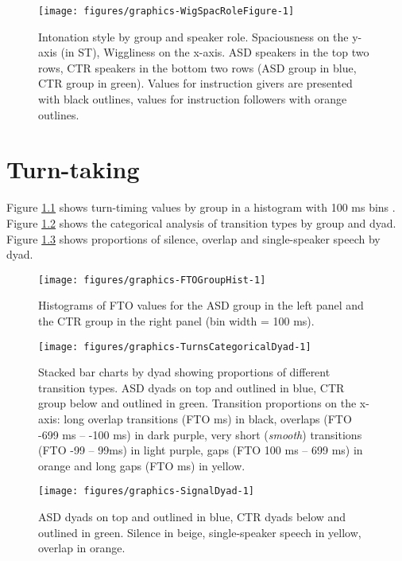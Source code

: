 \begin{figure}
\texttt{[image: figures/graphics-WigSpacRoleFigure-1]}
\caption{Intonation style by group and speaker role. Spaciousness on the y-axis (in ST), Wiggliness
on the x-axis. ASD speakers in the top two rows, CTR speakers in the bottom two rows (ASD group in blue, CTR group in green). Values for instruction givers are presented with black outlines, values for instruction followers with orange outlines. }\label{fig:WigSpacRoleFigure}
\end{figure}

\chapter{Turn-taking}\label{appendix:b}
Figure \ref{fig:FTOGroupHist} shows turn-timing values by group in a
histogram with 100 ms bins \citep[to match the analysis in][]{levinsonTimingTurntakingIts2015a}.
Figure \ref{fig:TurnsCategoricalDyad} shows the categorical analysis of
transition types by group and dyad.
Figure \ref{fig:SignalDyad} shows proportions of silence, overlap and
single-speaker speech by dyad.

\begin{figure}
\texttt{[image: figures/graphics-FTOGroupHist-1]}
\caption{Histograms of FTO values for the ASD group in the
left panel and the CTR group in the right panel (bin width = 100 ms).}\label{fig:FTOGroupHist}
\end{figure}

\begin{figure}
\texttt{[image: figures/graphics-TurnsCategoricalDyad-1]}
\caption{Stacked bar charts by dyad showing
proportions of different transition types. ASD dyads on top and outlined
in blue, CTR group below and outlined in green. Transition proportions
on the x-axis: long overlap transitions (FTO  ms) in black,
overlaps (FTO -699 ms -- -100 ms) in dark purple, very short (\textit{smooth})
transitions (FTO -99 -- 99ms) in light purple, gaps (FTO 100 ms -- 699 ms) in
orange and long gaps (FTO  ms) in yellow.}\label{fig:TurnsCategoricalDyad}
\end{figure}

\begin{figure}
\texttt{[image: figures/graphics-SignalDyad-1]}
\caption{ASD dyads on top and outlined in blue, CTR dyads below
and outlined in green. Silence in beige, single-speaker speech in
yellow, overlap in orange.}\label{fig:SignalDyad}
\end{figure}

